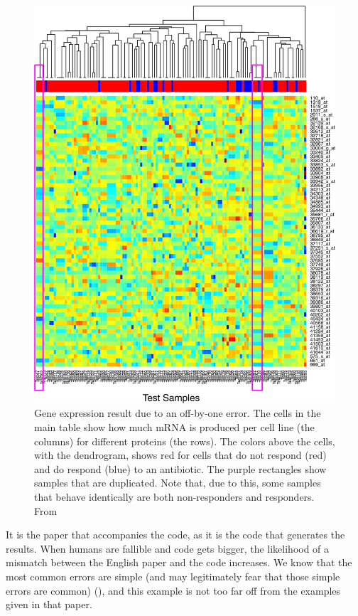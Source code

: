 \begin{figure}[!htbp]
  \centering
  \includegraphics[width=\linewidth]{baggerly2009deriving_fig_1a.png}
  \caption{
    Gene expression result due to an off-by-one error.
    The cells in the main table show how much mRNA is produced per cell 
    line (the columns) for different proteins (the rows).
    The colors above the cells, with the dendrogram, shows
    red for cells that do not respond (red) and do respond (blue) to an 
    antibiotic.
    The purple rectangles show samples that are duplicated.
    Note that, due to this, some
    samples that behave identically are both non-responders and responders.
    From \cite{baggerly2009deriving}
  }
  \label{fig:baggerly2009deriving}
\end{figure}

It is the paper that accompanies the code,
as it is the code that generates the results.
When humans are fallible and code gets bigger, the likelihood of
a mismatch between the English paper and the code increases.
We know that the most common errors are 
simple (and may legitimately fear that those simple errors are common) 
(\cite{baggerly2009deriving}),
and this example is not too far off from the
examples given in that paper.

